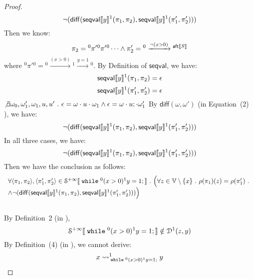 \begin{example}
\begin{proof}
 \[
  \neg(\mathsf{diff}(\mathsf{seqval}\llbracket y \rrbracket{}^1(\pi_1, \pi_2 ), \mathsf{seqval}\llbracket y \rrbracket{}^1(\pi_1', \pi_2' )))
 \]
 Then we know:
 \[
 \pi_2 = {}^0 \pi' {}^0 \pi' {}^0\cdots 
 \land 
 \pi_2' = {}^0 \xrightarrow{\neg(x > 0)} {}^{\mathsf{aft}\llbracket S \rrbracket}
 \]
 where ${}^0 \pi' {}^0 = {}^0 \xrightarrow{(x > 0)} {}^1 \xrightarrow{y = 1} {}^0$.
 By Definition of $\mathsf{seqval}$, we have:
 \[
  \mathsf{seqval}\llbracket y \rrbracket{}^1(\pi_1, \pi_2 ) = \epsilon
 \]
 \[
  \mathsf{seqval}\llbracket y \rrbracket{}^1(\pi_1', \pi_2' ) = \epsilon
 \]
  $\not \exists \omega_0, \omega_1', \omega_1, u, u' ~.~ 
  \epsilon = \omega \cdot u \cdot \omega_1 
  \land 
  \epsilon = \omega \cdot u; \cdot \omega_1'$
 By $\mathsf{diff}(\omega, \omega')$ (in \cite{cousot2019abstract} Equation~(2) ), we have:
 \[
  \neg(\mathsf{diff}(\mathsf{seqval}\llbracket y \rrbracket{}^1(\pi_1, \pi_2 ), \mathsf{seqval}\llbracket y \rrbracket{}^1(\pi_1', \pi_2' )))
 \]
 In all three cases, we have:
 \[
   \neg(\mathsf{diff}(\mathsf{seqval}\llbracket y \rrbracket{}^1(\pi_1, \pi_2 ), \mathsf{seqval}\llbracket y \rrbracket{}^1(\pi_1', \pi_2' )))
 \]
 Then we have the conclusion as follows:
 \[
 \begin{array}{l}
 	\forall \left< \pi_1, \pi_2 \right>,  \left< \pi_1', \pi'_2 \right> \in \mathcal{S}^{+\infty} \sem{\ewhile {}^0 (x > 0) {}^1 y = 1;} \st
 	\Big(
 	\forall z \in \mathbb{V}\setminus \{x\} \st \env(\pi_1)(z) = \env(\pi_1') \st \\
 	\land \neg(\mathsf{diff}(\mathsf{seqval}\sem{y}{}^1(\pi_1, \pi_2), \mathsf{seqval}\sem{y}{}^1(\pi_1', \pi_2' )))\Big)
 \end{array}
 \] 
 \\
 By Definition~2 (in \cite{cousot2019abstract}), 
 \[
 	\mathcal{S}^{+\infty}\llbracket \;\mathtt{while}\; {}^0 (x > 0) {}^1 y = 1; \rrbracket 
 \notin \mathcal{D}^1(z, y)
 \]
 By Definition~(4) (in \cite{cousot2019abstract}), we cannot derive:
 \[
 	x \rightsquigarrow^{1}_{\;\mathtt{while}\; {}^0 (x > 0) {}^1 y = 1;} y
 \]
 \end{proof}
 \end{example}
 \clearpage
